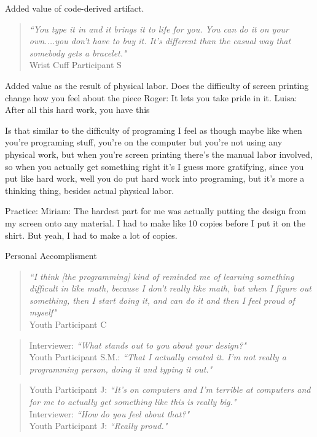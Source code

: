\documentclass{sigchi}
\begin{document}
Added value of code-derived artifact.\\
 \begin{quotation}
\textit{``You type it in and it brings it to life for you. You can do it on your own....you don't have to buy it. It's different than the casual way that somebody gets a bracelet."}
\\Wrist Cuff Participant S
 \end{quotation}
Added value as the result of physical labor.
Does the difficulty of screen printing change how you feel about the piece
Roger: It lets you take pride in it.
Luisa: After all this hard work, you have this	

Is that similar to the difficulty of programing
I feel as though maybe like when you're programing stuff, you're on the computer but you're not using any physical work, but when you're screen printing there's the manual labor involved, so when you actually get something right it's I guess more gratifying, since you put like hard work, well you do put hard work into programing, but it's more a thinking thing, besides actual physical labor.

Practice:
Miriam: The hardest part for me was actually putting the design from my screen onto any material. I had to make like 10 copies before I put it on the shirt. But yeah, I had to make a lot of copies. 

Personal Accomplisment
\begin{quotation}
 \textit{``I think [the programming] kind of reminded me of learning something difficult in like math, because I don't really like math, but when I figure out something, then I start doing it, and can do it and then I feel proud of myself"}
 \\Youth Participant C
\end{quotation}

 \begin{quotation}
 Interviewer:  \textit{``What stands out to you about your design?"}
 \\Youth Participant S.M.: \textit{``That I actually created it. I'm not really a programming person, doing it and typing it out."}
 \end{quotation}
 
 \begin{quotation}
Youth Participant J: \textit{``It's on computers and I'm terrible at computers and for me to actually get something like this is really big."} 
\\Interviewer:  \textit{``How do you feel about that?"}
\\Youth Participant J:  \textit{``Really proud."}	
\end{quotation}
\end{document}
